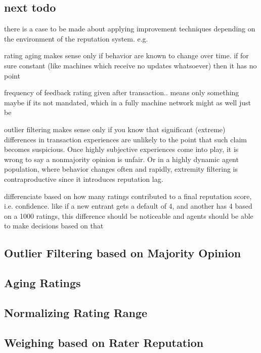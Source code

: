 \documentclass[%
    ]{\PathToTumTemplate/thesis/tum_thesis}
\begin{document}
\subsection{next todo}

there is a case to be made about applying improvement techniques depending on the environment of the reputation system. e.g.

rating aging makes sense only if behavior are known to change over time. if for sure constant (like machines which receive no updates whatsoever) then it has no point

frequency of feedback rating given after transaction.. means only something maybe if its not mandated, which in a fully machine network might as well just be

outlier filtering makes sense only if you know that significant (extreme) differences in transaction experiences are unlikely to the point that such claim becomes suspicious. Once highly subjective experiences come into play, it is wrong to say a nonmajority opinion is unfair. Or in a highly dynamic agent population, where behavior changes often and rapidly, extremity filtering is contraproductive since it introduces reputation lag.



differenciate based on how many ratings contributed to a final reputation score, i.e. confidence. like if a new entrant gets a default of 4, and another has 4 based on a 1000 ratings, this difference should be noticeable and agents should be able to make decisions based on that

\subsection{Outlier Filtering based on Majority Opinion}

\subsection{Aging Ratings}

\subsection{Normalizing Rating Range}

\subsection{Weighing based on Rater Reputation}
\end{document}

